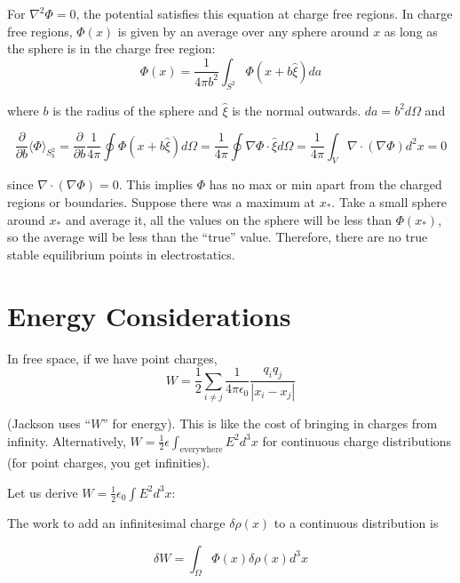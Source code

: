 \documentclass[a4paper,twoside,master.tex]{subfiles}
\begin{document}
\begin{remark}
For $\nabla^2\Phi = 0$, the potential satisfies this equation at charge free regions. In charge free regions, $\Phi(x)$ is given by an average over any sphere around $x$ as long as the sphere is in the charge free region:
\begin{equation}
    \Phi(x) = \frac{1}{4\pi b^2}\int_{S^2}\Phi(x+b\hat{\xi})da
\end{equation}

where $b$ is the radius of the sphere and $\hat{\xi}$ is the normal outwards. $da = b^2 d\Omega$ and

\begin{equation}
   \frac{\partial}{\partial b}\langle\Phi\rangle_{S^2_b} = \frac{\partial}{\partial b}\frac{1}{4\pi}\oint\Phi(x+b\hat{\xi})d\Omega = \frac{1}{4\pi}\oint\nabla\Phi\cdot\hat{\xi}d\Omega = \frac{1}{4\pi}\int_{V}\nabla\cdot(\nabla\Phi) d^2x = 0
\end{equation}

since $\nabla\cdot(\nabla\Phi) = 0$. This implies $\Phi$ has no max or min apart from the charged regions or boundaries. Suppose there was a maximum at $x_*$. Take a small sphere around $x_*$ and average it, all the values on the sphere will be less than $\Phi(x_*)$, so the average will be less than the ``true'' value. Therefore, there are no true stable equilibrium points in electrostatics.
\end{remark}

\section{Energy Considerations}%
\label{sec:energy_considerations}

In free space, if we have point charges,
\begin{equation}
   W = \frac{1}{2}\sum_{i\neq j}\frac{1}{4\pi\epsilon_0}\frac{q_i q_j}{|x_i-x_j|}
\end{equation}

(Jackson uses ``$W$'' for energy). This is like the cost of bringing in charges from infinity. Alternatively, $W = \frac{1}{2}\epsilon\int_\text{everywhere} E^2 d^3x$ for continuous charge distributions (for point charges, you get infinities).

Let us derive $W=\frac{1}{2}\epsilon_0\int E^2 d^3x$:

The work to add an infinitesimal charge $\delta\rho(x)$ to a
continuous distribution is

\begin{equation}
   \delta W = \int_\Omega\Phi(x)\delta\rho(x)d^3x
\end{equation}
\end{document}

